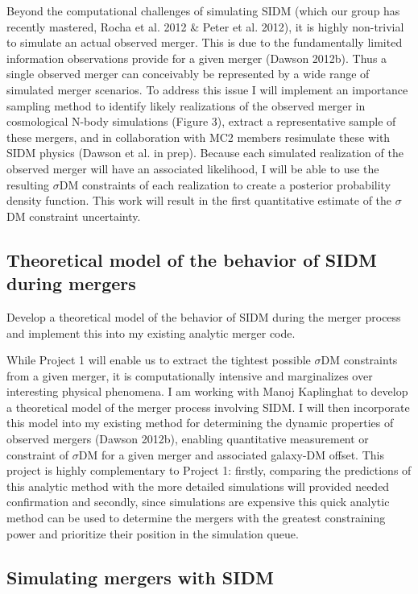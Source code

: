 Beyond the computational challenges of simulating SIDM (which our group has recently mastered, Rocha et al. 2012 \& Peter et al. 2012), it is highly non-trivial to simulate an actual observed merger. This is due to the fundamentally limited information observations provide for a given merger (Dawson 2012b). Thus a single observed merger can conceivably be represented by a wide range of simulated merger scenarios. To address this issue I will implement an importance sampling method to identify likely realizations of the observed merger in cosmological N-body simulations (Figure 3), extract a representative sample of these mergers, and in collaboration with MC2 members resimulate these with SIDM physics (Dawson et al. in prep).  Because each simulated realization of the observed merger will have an associated likelihood, I will be able to use the resulting $\sigma$DM  constraints of each realization to create a posterior probability density function.  This work will result in the first quantitative estimate of the $\sigma$DM  constraint uncertainty. 

\subsection{Theoretical model of the behavior of SIDM during mergers}

Develop a theoretical model of the behavior of SIDM during the merger process and implement this into my existing analytic merger code. 

While Project 1 will enable us to extract the tightest possible $\sigma$DM  constraints from a given merger, it is computationally intensive and marginalizes over interesting physical phenomena.  I am working with Manoj Kaplinghat to develop a theoretical model of the merger process involving SIDM.  I will then incorporate this model into my existing method for determining the dynamic properties of observed mergers (Dawson 2012b), enabling quantitative measurement or constraint of $\sigma$DM  for a given merger and associated galaxy-DM offset.  This project is highly complementary to Project 1: firstly, comparing the predictions of this analytic method with the more detailed simulations will provided needed confirmation and secondly, since simulations are expensive this quick analytic method can be used to determine the mergers with the greatest constraining power and prioritize their position in the simulation queue.

\subsection{Simulating mergers with SIDM}

